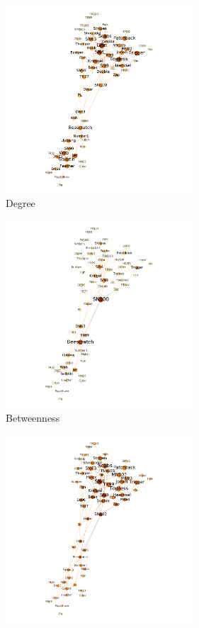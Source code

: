 \begin{figure}
  \begin{subfigure}{7cm}
    \centering\includegraphics[width=7cm]{images/chapter3/dolphin/degree.png}
    \caption{Degree}
    \end{subfigure}
  \begin{subfigure}{7cm}
    \centering\includegraphics[width=7cm]{images/chapter3/dolphin/betweenness.png}
    \caption{Betweenness}
  \end{subfigure}
  \begin{subfigure}{7cm}
    \centering\includegraphics[width=7cm]{images/chapter3/dolphin/closeness.png}

\end{subfigure}
\end{figure}
